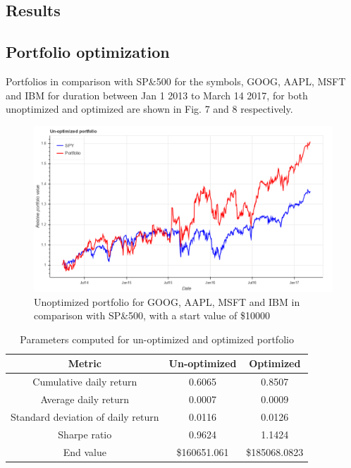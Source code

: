 \documentclass[12pt]{article}
\begin{document}
\begin{itemize}
\section{Results}

\subsection{Portfolio optimization}
\label{sec:opt}

Portfolios in comparison with SP\&500 for the symbols, GOOG, AAPL, MSFT and IBM for duration between Jan 1 2013 to March 14 2017, for both unoptimized and optimized are shown in Fig. 7 and 8 respectively.


\begin{figure}[!htbp]
\label{fig:unoptimized}
\begin{center}
\includegraphics[height=0.5\textheight,width=\textwidth]{unoptimized.png}
\caption{Unoptimized portfolio for GOOG, AAPL, MSFT and IBM in comparison with SP\&500, with a start value of \$10000}
\end{center}
\end{figure}

\begin{table}
\begin{center}
\begin{tabular} {|c|c|c|}
\hline \hline
\textbf{Metric} & \textbf{Un-optimized} & \textbf{Optimized}  \\ \hline
Cumulative daily return & 0.6065 & 0.8507 \\ \hline
Average daily return & 0.0007 & 0.0009\\ \hline
Standard deviation of daily return  & 0.0116 & 0.0126  \\ \hline
Sharpe ratio & 0.9624 & 1.1424 \\ \hline
End value & \$160651.061 & \$185068.0823 \\ \hline
\hline
\end{tabular}
\end{center}
\caption{Parameters computed for un-optimized and optimized portfolio}
\end{table}




\end{itemize}
\end{document}
